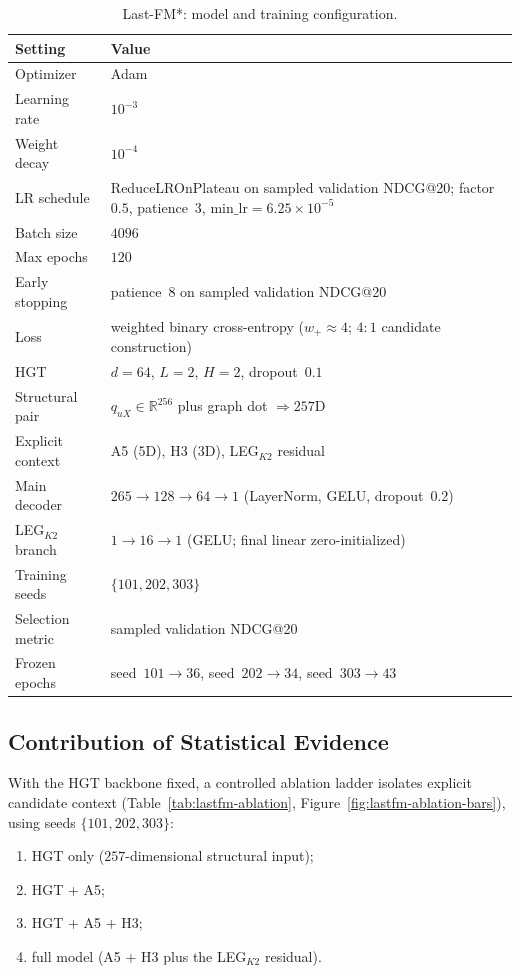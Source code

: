 \begin{table}[!ht]
\centering
\footnotesize
\setlength{\tabcolsep}{4pt}
\caption{Last-FM*: model and training configuration.}
\label{tab:lastfm-train}
\begin{tabularx}{\textwidth}{@{}>{\raggedright\arraybackslash}p{2.85cm} X@{}}
\toprule
Setting & Value \\
\midrule
Optimizer & Adam~\cite{kingma2015adam} \\
Learning rate & $10^{-3}$ \\
Weight decay & $10^{-4}$ \\
LR schedule & ReduceLROnPlateau on sampled validation NDCG@20;
  factor~$0.5$, patience~$3$, $\mathrm{min\_lr}=6.25\times 10^{-5}$ \\
Batch size & $4096$ \\
Max epochs & $120$ \\
Early stopping & patience~$8$ on sampled validation NDCG@20 \\
Loss & weighted binary cross-entropy ($w_{+}\approx 4$; $4{:}1$ candidate construction) \\
HGT & $d=64$, $L=2$, $H=2$, dropout~$0.1$~\cite{hu2020hgt} \\
Structural pair & $q_{uX}\in\mathbb{R}^{256}$ plus graph dot $\Rightarrow 257$D \\
Explicit context & A5 ($5$D), H3 ($3$D), LEG$_{K2}$ residual \\
Main decoder & $265\to 128\to 64\to 1$ (LayerNorm, GELU, dropout~$0.2$) \\
LEG$_{K2}$ branch & $1\to 16\to 1$ (GELU; final linear zero-initialized) \\
Training seeds & $\{101,202,303\}$ \\
Selection metric & sampled validation NDCG@20 \\
Frozen epochs & seed~$101\to 36$, seed~$202\to 34$, seed~$303\to 43$ \\
\bottomrule
\end{tabularx}
\end{table}

\subsection{Contribution of Statistical Evidence}
\label{sec:lastfm-ablation}

With the HGT backbone fixed, a controlled ablation ladder isolates explicit candidate context (Table~\ref{tab:lastfm-ablation}, Figure~\ref{fig:lastfm-ablation-bars}), using seeds $\{101,202,303\}$:
\begin{enumerate}
\item HGT only ($257$-dimensional structural input);
\item HGT + A5;
\item HGT + A5 + H3;
\item full model (A5 + H3 plus the LEG$_{K2}$ residual).
\end{enumerate}

